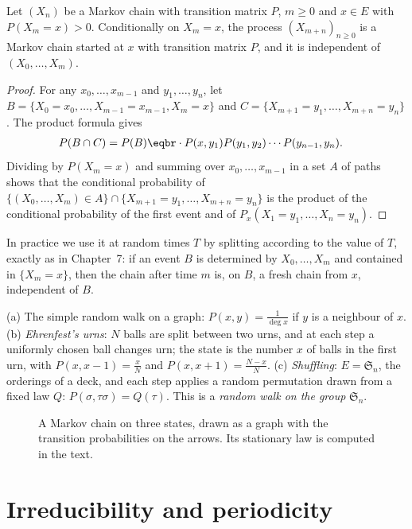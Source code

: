 \begin{proposition}\label{prop:markovprop}
Let $(X_n)$ be a Markov chain with transition matrix $P$, $m\ge0$ and $x\in E$ with $P(X_m=x)>0$. Conditionally on $X_m=x$, the
process $(X_{m+n})_{n\ge0}$ is a Markov chain started at $x$ with transition matrix $P$, and it is independent of $(X_0,\dots,X_m)$.
\end{proposition}
\begin{proof}
For any $x_0,\dots,x_{m-1}$ and $y_1,\dots,y_n$, let $B=\{X_0=x_0,\dots,X_{m-1}=x_{m-1},X_m=x\}$ and $C=\{X_{m+1}=y_1,\dots,X_{m+n}=y_n\}$. The product formula gives
\[
\begin{aligned}P(B\cap C)&=P(B)\eqbr\cdot P(x,y_1)P(y_1,y_2)\cdots P(y_{n-1},y_n).\end{aligned}
\]
Dividing by $P(X_m=x)$ and summing over $x_0,\dots,x_{m-1}$ in a set $A$ of paths shows that the conditional probability of
$\{(X_0,\dots,X_m)\in A\}\cap\{X_{m+1}=y_1,\dots,X_{m+n}=y_n\}$ is the product of the conditional probability of the first event and of
$P_x(X_1=y_1,\dots,X_n=y_n)$.
\end{proof}

In practice we use it at random times $T$ by splitting according to the value of $T$, exactly as in Chapter~7: if an
event $B$ is determined by $X_0,\dots,X_m$ and contained in $\{X_m=x\}$, then the chain after time $m$ is, on $B$, a fresh chain from $x$,
independent of $B$.

\begin{example}\label{ex:examples}
(a) The simple random walk on a graph: $P(x,y)=\frac1{\deg x}$ if $y$ is a neighbour of $x$. (b) \emph{Ehrenfest's urns}: $N$ balls are
split between two urns, and at each step a uniformly chosen ball changes urn; the state is the number $x$ of balls in the
first urn, with $P(x,x-1)=\frac xN$ and $P(x,x+1)=\frac{N-x}N$. (c) \emph{Shuffling}: $E=\mathfrak S_n$, the orderings of a deck, and each step applies
a random permutation drawn from a fixed law $Q$: $P(\sigma,\tau\sigma)=Q(\tau)$. This is a \emph{random walk on the group} $\mathfrak S_n$.
\end{example}

\begin{figure}[ht]
\centering
{}
\caption{A Markov chain on three states, drawn as a graph with the transition probabilities on the arrows. Its
stationary law is computed in the text.}
\label{fig:chain}
\end{figure}

\section{Irreducibility and periodicity}

